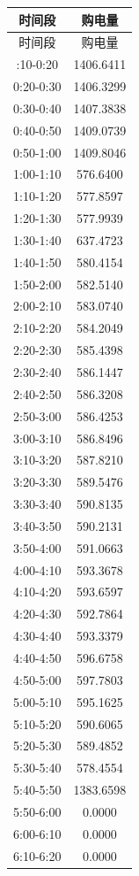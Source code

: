 \begingroup\normalsize
\begin{longtable}{@{}cc@{}}
\toprule
时间段 & 购电量 \\
\midrule
\endfirsthead
\toprule
时间段 & 购电量 \\
\midrule
\endhead
\bottomrule
\endfoot
0:10-0:20 & 1406.6411 \\
0:20-0:30 & 1406.3299 \\
0:30-0:40 & 1407.3838 \\
0:40-0:50 & 1409.0739 \\
0:50-1:00 & 1409.8046 \\
1:00-1:10 & 576.6400 \\
1:10-1:20 & 577.8597 \\
1:20-1:30 & 577.9939 \\
1:30-1:40 & 637.4723 \\
1:40-1:50 & 580.4154 \\
1:50-2:00 & 582.5140 \\
2:00-2:10 & 583.0740 \\
2:10-2:20 & 584.2049 \\
2:20-2:30 & 585.4398 \\
2:30-2:40 & 586.1447 \\
2:40-2:50 & 586.3208 \\
2:50-3:00 & 586.4253 \\
3:00-3:10 & 586.8496 \\
3:10-3:20 & 587.8210 \\
3:20-3:30 & 589.5476 \\
3:30-3:40 & 590.8135 \\
3:40-3:50 & 590.2131 \\
3:50-4:00 & 591.0663 \\
4:00-4:10 & 593.3678 \\
4:10-4:20 & 593.6597 \\
4:20-4:30 & 592.7864 \\
4:30-4:40 & 593.3379 \\
4:40-4:50 & 596.6758 \\
4:50-5:00 & 597.7803 \\
5:00-5:10 & 595.1625 \\
5:10-5:20 & 590.6065 \\
5:20-5:30 & 589.4852 \\
5:30-5:40 & 578.4554 \\
5:40-5:50 & 1383.6598 \\
5:50-6:00 & 0.0000 \\
6:00-6:10 & 0.0000 \\
6:10-6:20 & 0.0000 \\

\end{longtable}
